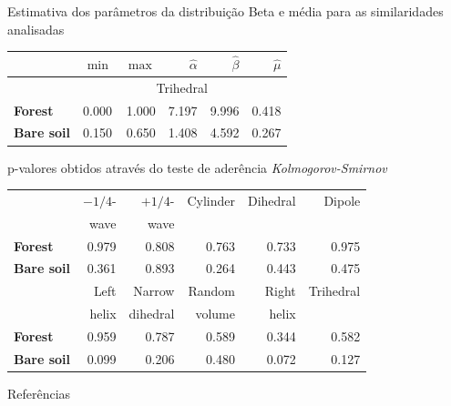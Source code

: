 \documentclass[10pt]{beamer}
\begin{document}
\begin{frame}{Estimativa dos parâmetros da distribuição Beta e média para as similaridades analisadas}
\begin{table}[hbt]
\centering
\begin{tabular}{lrrrrr}
\toprule
& $\min$ & $\max$ & $\widehat\alpha$ & $\widehat\beta$ & $\widehat\mu$\\ \midrule
& \multicolumn{5}{c}{Trihedral}\\
\cmidrule(lr){2-6}
\textbf{Forest} & 0.000 & 1.000 & 7.197 & 9.996 & 0.418\\
\textbf{Bare soil} & 0.150 & 0.650 & 1.408 & 4.592 & 0.267\\
\bottomrule
\end{tabular}
\end{table}
\end{frame}

\begin{frame}{p-valores obtidos através do teste de aderência \textit{Kolmogorov-Smirnov}}
\begin{table}[hbt]
\centering
\begin{tabular}{lrrrrr}
\toprule
& $-1/4$- & $+1/4$- & Cylinder & Dihedral & Dipole\\
& wave & wave & & &\\
\cmidrule(lr){2-6}
\textbf{Forest} & 0.979 & 0.808 & 0.763 & 0.733 & 0.975\\
\textbf{Bare soil} & 0.361 & 0.893 & 0.264 & 0.443 & 0.475\\
\midrule
& Left & Narrow & Random & Right & Trihedral\\
& helix & dihedral & volume & helix & \\
\cmidrule(lr){2-6}
\textbf{Forest} & 0.959 & 0.787 & 0.589 & 0.344 & 0.582\\
\textbf{Bare soil} & 0.099 & 0.206 & 0.480 & 0.072 & 0.127\\
\bottomrule
\end{tabular} 
\end{table}

\end{frame}

\begin{frame}{Referências}
    
    
\end{frame}
\end{document}
